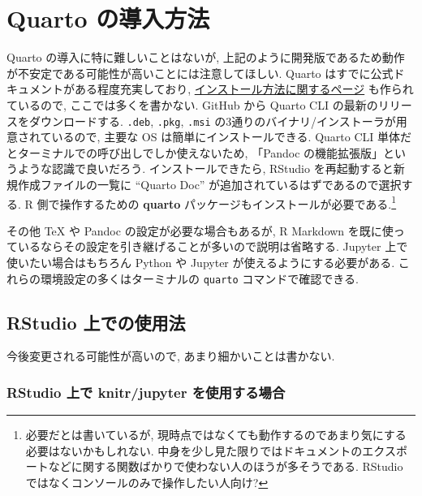\documentclass[
  letterpaper,
  DIV=11,
  pandoc,
  ja=standard,
  jafont=noto-otf]{bxjsarticle}
\begin{document}
\hypertarget{quarto-ux306eux5c0eux5165ux65b9ux6cd5}{%
\section{Quarto
の導入方法}\label{quarto-ux306eux5c0eux5165ux65b9ux6cd5}}

Quarto の導入に特に難しいことはないが,
上記のように開発版であるため動作が不安定である可能性が高いことには注意してほしい.
Quarto はすでに公式ドキュメントがある程度充実しており,
\href{https://quarto.org/docs/getting-started/installation.html}{インストール方法に関するページ}
も作られているので, ここでは多くを書かない. GitHub から Quarto CLI
の最新のリリースをダウンロードする. \texttt{.deb}, \texttt{.pkg},
\texttt{.msi} の3通りのバイナリ/インストーラが用意されているので, 主要な
OS は簡単にインストールできる. Quarto CLI
単体だとターミナルでの呼び出しでしか使えないため, 「Pandoc
の機能拡張版」というような認識で良いだろう. インストールできたら,
RStudio を再起動すると新規作成ファイルの一覧に ``Quarto Doc''
が追加されているはずであるので選択する. R 側で操作するための
\textbf{quarto} パッケージもインストールが必要である.\footnote{必要だとは書いているが,
  現時点ではなくても動作するのであまり気にする必要はないかもしれない.
  中身を少し見た限りではドキュメントのエクスポートなどに関する関数ばかりで使わない人のほうが多そうである.
  RStudio ではなくコンソールのみで操作したい人向け?}

その他 TeX や Pandoc の設定が必要な場合もあるが, R Markdown
を既に使っているならその設定を引き継げることが多いので説明は省略する.
Jupyter 上で使いたい場合はもちろん Python や Jupyter
が使えるようにする必要がある. これらの環境設定の多くはターミナルの
\texttt{quarto} コマンドで確認できる.

\hypertarget{rstudio-ux4e0aux3067ux306eux4f7fux7528ux6cd5}{%
\subsection{RStudio
上での使用法}\label{rstudio-ux4e0aux3067ux306eux4f7fux7528ux6cd5}}

今後変更される可能性が高いので, あまり細かいことは書かない.

\hypertarget{rstudio-ux4e0aux3067-knitrjupyter-ux3092ux4f7fux7528ux3059ux308bux5834ux5408}{%
\subsubsection{RStudio 上で knitr/jupyter
を使用する場合}\label{rstudio-ux4e0aux3067-knitrjupyter-ux3092ux4f7fux7528ux3059ux308bux5834ux5408}}
\end{document}
